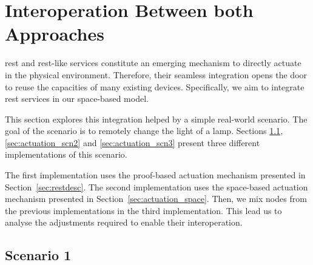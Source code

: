 \section{Interoperation Between both Approaches}
\label{sec:actuation_interoperation}


\ac{rest} and \ac{rest}-like services constitute an emerging mechanism to directly actuate in the physical environment.
Therefore, their seamless integration opens the door to reuse the capacities of many existing devices. %
Specifically, we aim to integrate \ac{rest} services in our space-based model. %


This section explores this integration helped by a simple real-world scenario.
The goal of the scenario is to remotely change the light of a lamp.
Sections \ref{sec:actuation_scn1}, \ref{sec:actuation_scn2} and \ref{sec:actuation_scn3} present three different implementations of this scenario. %


The first implementation uses the proof-based actuation mechanism presented in Section~\ref{sec:restdesc}.
The second implementation uses the space-based actuation mechanism presented in Section~\ref{sec:actuation_space}.
Then, we mix nodes from the previous implementations in the third implementation.
This lead us to analyse the adjustments required to enable their interoperation.



\newcommand{\nodea}{\emph{A} node}
\newcommand{\nodeb}{\emph{B} node}
\newcommand{\nodec}{\emph{C} node}
\newcommand{\noded}{\emph{D} node}



\subsection{Scenario 1}
\label{sec:actuation_scn1}


